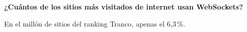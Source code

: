 \begin{frame}
  \vfill
  \centering
  {\fontsize{22}{27}\selectfont\bfseries
    ¿Cuántos de los sitios más visitados de internet usan WebSockets?\par}
  \vspace{0.4cm}
  {\large En el millón de sitios del ranking Tranco, apenas el 6,3\,\%.\par}
  \vspace{0.5cm}
  {\small\color{bcmGris}\cite[secc.~3.3, p.~1195]{Murley2021}\par}
  \vfill
\end{frame}
